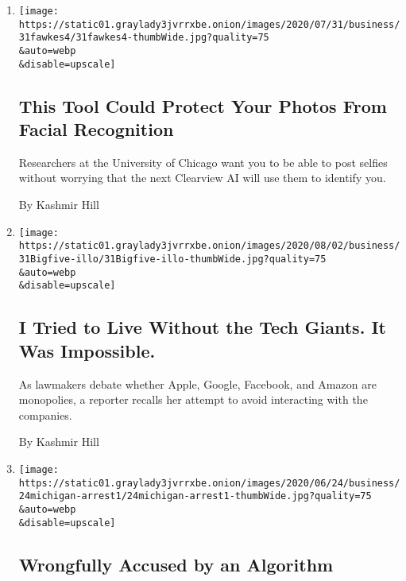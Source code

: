 \begin{enumerate}
\def\labelenumi{\arabic{enumi}.}
\item
  \href{/2020/08/03/technology/fawkes-tool-protects-photos-from-facial-recognition.html}{}

  \texttt{[image: https://static01.graylady3jvrrxbe.onion/images/2020/07/31/business/31fawkes4/31fawkes4-thumbWide.jpg?quality=75\\\&auto=webp\\\&disable=upscale]}

  \hypertarget{this-tool-could-protect-your-photos-from-facial-recognition}{%
  \subsection{This Tool Could Protect Your Photos From Facial
  Recognition}\label{this-tool-could-protect-your-photos-from-facial-recognition}}

  Researchers at the University of Chicago want you to be able to post
  selfies without worrying that the next Clearview AI will use them to
  identify you.

  By Kashmir Hill
\item
  \href{/2020/07/31/technology/blocking-the-tech-giants.html}{}

  \texttt{[image: https://static01.graylady3jvrrxbe.onion/images/2020/08/02/business/31Bigfive-illo/31Bigfive-illo-thumbWide.jpg?quality=75\\\&auto=webp\\\&disable=upscale]}

  \hypertarget{i-tried-to-live-without-the-tech-giants-it-was-impossible}{%
  \subsection{I Tried to Live Without the Tech Giants. It Was
  Impossible.}\label{i-tried-to-live-without-the-tech-giants-it-was-impossible}}

  As lawmakers debate whether Apple, Google, Facebook, and Amazon are
  monopolies, a reporter recalls her attempt to avoid interacting with
  the companies.

  By Kashmir Hill
\item
  \href{/2020/06/24/technology/facial-recognition-arrest.html}{}

  \texttt{[image: https://static01.graylady3jvrrxbe.onion/images/2020/06/24/business/24michigan-arrest1/24michigan-arrest1-thumbWide.jpg?quality=75\\\&auto=webp\\\&disable=upscale]}

  \hypertarget{wrongfully-accused-by-an-algorithm}{%
  \subsection{Wrongfully Accused by an
  Algorithm}\label{wrongfully-accused-by-an-algorithm}}


\end{enumerate}
